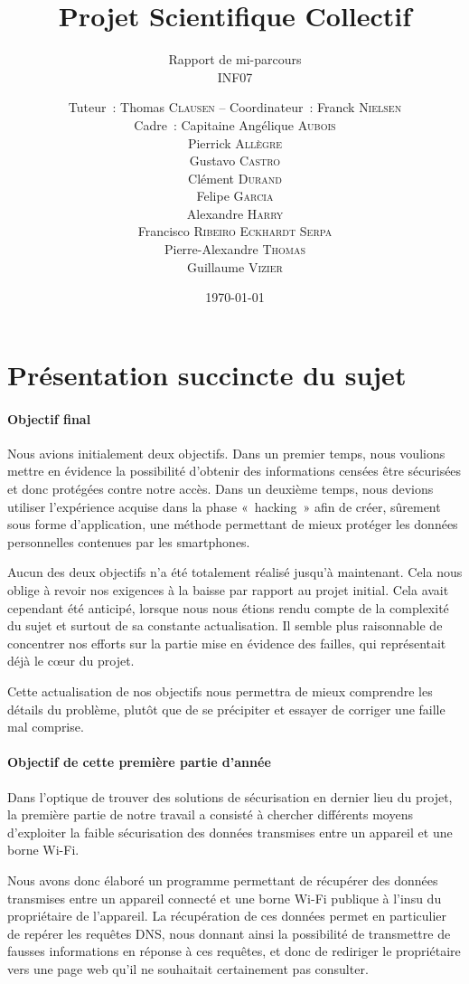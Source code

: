 \documentclass[a4paper, 12pt,twoside]{article}
\title{Projet Scientifique Collectif}
\author{Tuteur~: Thomas \textsc{Clausen} -- Coordinateur~: Franck \textsc{Nielsen} \\
        Cadre~: Capitaine Angélique \textsc{Aubois} \\
        Pierrick \textsc{Allègre} \\
        Gustavo \textsc{Castro} \\
        Clément \textsc{Durand} \\
        Felipe \textsc{Garcia} \\
        Alexandre \textsc{Harry} \\
        Francisco \textsc{Ribeiro Eckhardt Serpa} \\
        Pierre-Alexandre \textsc{Thomas} \\
        Guillaume \textsc{Vizier} \\}
\subtitle{Rapport de mi-parcours \\ INF07}
\date{\today}
\begin{document}
\maketitle
\renewcommand{\baselinestretch}{1.1}
\setlength{\parskip}{0.5em}
\tableofcontents
\clearpage

\section*{Présentation succincte du sujet}

    \paragraph{Objectif final} Nous avions initialement deux objectifs. Dans un premier temps, nous voulions mettre en évidence la possibilité d'obtenir des informations censées être sécurisées et donc protégées contre notre accès. Dans un deuxième temps, nous devions utiliser l'expérience acquise dans la phase «~hacking~» afin de créer, sûrement sous forme d'application, une méthode permettant de mieux protéger les données personnelles contenues par les smartphones.
    
    Aucun des deux objectifs n'a été totalement réalisé jusqu'à maintenant. Cela nous oblige à revoir nos exigences à la baisse par rapport au projet initial. Cela avait cependant été anticipé, lorsque nous nous étions rendu compte de la complexité du sujet et surtout de sa constante actualisation. Il semble plus raisonnable de concentrer nos efforts sur la partie mise en évidence des failles, qui représentait déjà le c\oe{}ur du projet.
    
    Cette actualisation de nos objectifs nous permettra de mieux comprendre les détails du problème, plutôt que de se précipiter et essayer de corriger une faille mal comprise.

    \paragraph{Objectif de cette première partie d'année}

    Dans l'optique de trouver des solutions de sécurisation en dernier lieu du projet, la première partie de notre travail a consisté à chercher différents moyens d'exploiter la faible sécurisation des données transmises entre un appareil et une borne Wi-Fi.

    Nous avons donc élaboré un programme permettant de récupérer des données transmises entre un appareil connecté et une borne Wi-Fi publique à l'insu du propriétaire de l'appareil. La récupération de ces données permet en particulier de repérer les requêtes DNS, nous donnant ainsi la possibilité de transmettre de fausses informations en réponse à ces requêtes, et donc de rediriger le propriétaire vers une page web qu'il ne souhaitait certainement pas consulter.
\end{document}
